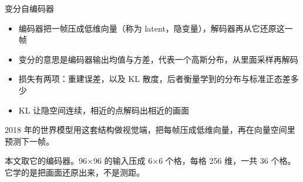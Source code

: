 \documentclass[serif, aspectratio=169]{beamer}
\newcommand{\currentref}{}
\newcommand{\src}[1]{\gdef\currentref{#1}}
\begin{document}
\begin{frame}{变分自编码器}

\begin{itemize}
    \item 编码器把一帧压成低维向量（称为 latent，隐变量），解码器再从它还原这一帧
    \item 变分的意思是编码器输出均值与方差，代表一个高斯分布，从里面采样再解码
    \item 损失有两项：重建误差，以及 KL 散度，后者衡量学到的分布与标准正态差多少
    \item KL 让隐空间连续，相近的点解码出相近的画面
\end{itemize}

\vspace{0.2cm}
2018 年的世界模型用这套结构做视觉端，把每帧压成低维向量，再在向量空间里预测下一帧。

\vspace{0.15cm}
本文取它的编码器。96$\times$96 的输入压成 6$\times$6 个格，每格 256 维，一共 36 个格。它学的是把画面还原出来，不是测距。

\src{Kingma D P, Welling M. Auto-Encoding Variational Bayes. ICLR, 2014.}
\end{frame}
\end{document}
